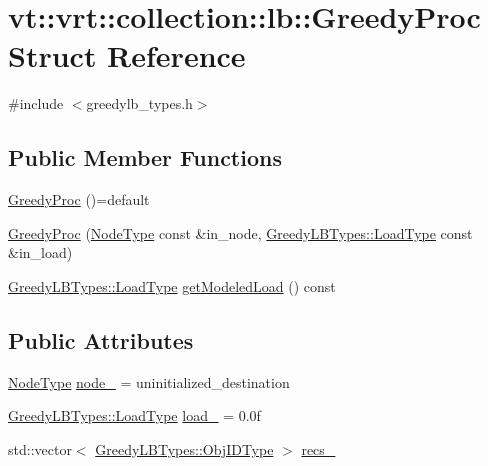 \hypertarget{structvt_1_1vrt_1_1collection_1_1lb_1_1_greedy_proc}{}\section{vt\+:\+:vrt\+:\+:collection\+:\+:lb\+:\+:Greedy\+Proc Struct Reference}
\label{structvt_1_1vrt_1_1collection_1_1lb_1_1_greedy_proc}


{\ttfamily \#include $<$greedylb\+\_\+types.\+h$>$}

\subsection*{Public Member Functions}
\begin{DoxyCompactItemize}
\item 
\hyperlink{structvt_1_1vrt_1_1collection_1_1lb_1_1_greedy_proc_acbbebf3b853047385b532825ae8f21fe}{Greedy\+Proc} ()=default
\item 
\hyperlink{structvt_1_1vrt_1_1collection_1_1lb_1_1_greedy_proc_a385378e718afd3f52760ebb179cfdb57}{Greedy\+Proc} (\hyperlink{namespacevt_a866da9d0efc19c0a1ce79e9e492f47e2}{Node\+Type} const \&in\+\_\+node, \hyperlink{structvt_1_1vrt_1_1collection_1_1lb_1_1_greedy_l_b_types_a9fe8829bc0c92e88ddf9d149233a54f4}{Greedy\+L\+B\+Types\+::\+Load\+Type} const \&in\+\_\+load)
\item 
\hyperlink{structvt_1_1vrt_1_1collection_1_1lb_1_1_greedy_l_b_types_a9fe8829bc0c92e88ddf9d149233a54f4}{Greedy\+L\+B\+Types\+::\+Load\+Type} \hyperlink{structvt_1_1vrt_1_1collection_1_1lb_1_1_greedy_proc_a83ea7d9efb6f090003bfcb7e4d6bcd79}{get\+Modeled\+Load} () const
\end{DoxyCompactItemize}
\subsection*{Public Attributes}
\begin{DoxyCompactItemize}
\item 
\hyperlink{namespacevt_a866da9d0efc19c0a1ce79e9e492f47e2}{Node\+Type} \hyperlink{structvt_1_1vrt_1_1collection_1_1lb_1_1_greedy_proc_aad516b90985606d8d27ddd89e0109a6a}{node\+\_\+} = uninitialized\+\_\+destination
\item 
\hyperlink{structvt_1_1vrt_1_1collection_1_1lb_1_1_greedy_l_b_types_a9fe8829bc0c92e88ddf9d149233a54f4}{Greedy\+L\+B\+Types\+::\+Load\+Type} \hyperlink{structvt_1_1vrt_1_1collection_1_1lb_1_1_greedy_proc_a139e7722596ed8f891af1b16da8d8f3d}{load\+\_\+} = 0.\+0f
\item 
std\+::vector$<$ \hyperlink{structvt_1_1vrt_1_1collection_1_1lb_1_1_greedy_l_b_types_ae22670acd689e4ff83315fac2e4acb5e}{Greedy\+L\+B\+Types\+::\+Obj\+I\+D\+Type} $>$ \hyperlink{structvt_1_1vrt_1_1collection_1_1lb_1_1_greedy_proc_a601dd3243831370af2d1e791152902b3}{recs\+\_\+}
\end{DoxyCompactItemize}


